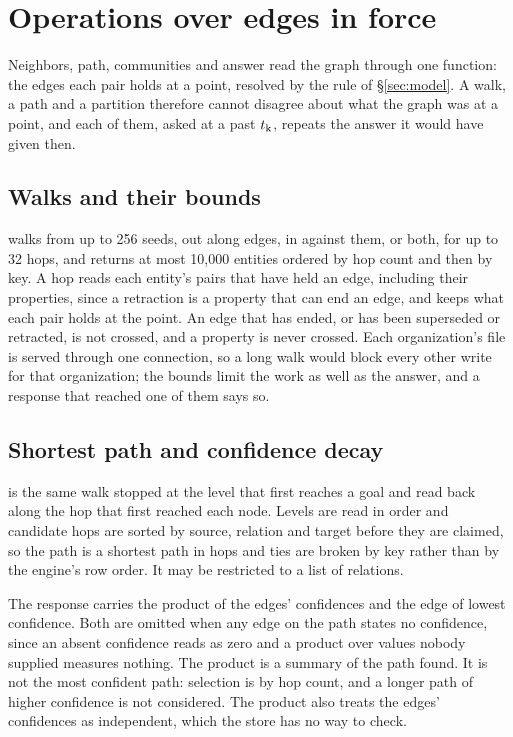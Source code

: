 \section{Operations over edges in force}
\label{sec:queries}

Neighbors, path, communities and answer read the graph through one function: the
edges each pair holds at a point, resolved by the rule of \S\ref{sec:model}.
A walk, a path and a partition therefore cannot disagree about what the graph
was at a point, and each of them, asked at a past $t_{\mathrm{k}}$, repeats the answer it
would have given then.

\subsection{Walks and their bounds}

\shipped{}  walks from up to 256 seeds, out along edges, in against
them, or both, for up to 32 hops, and returns at most 10{,}000 entities ordered by
hop count and then by key. A hop reads each entity's pairs that have held an
edge, including their properties, since a retraction is a property that can end
an edge, and keeps what each pair holds at the point. An edge that has ended, or
has been superseded or retracted, is not crossed, and a property is never
crossed. Each organization's file is served through one connection, so a long
walk would block every other write for that organization; the bounds limit the
work as well as the answer, and a response that reached one of them says so.

\subsection{Shortest path and confidence decay}

\shipped{}  is the same walk stopped at the level that first reaches a
goal and read back along the hop that first reached each node. Levels are read
in order and candidate hops are sorted by source, relation and target before
they are claimed, so the path is a shortest path in hops and ties are broken by
key rather than by the engine's row order. It may be restricted to a list of
relations.

The response carries the product of the edges' confidences and the edge of
lowest confidence. Both are omitted when any edge on the path states no
confidence, since an absent confidence reads as zero and a product over values
nobody supplied measures nothing. The product is a summary of the path found. It
is not the most confident path: selection is by hop count, and a longer path of
higher confidence is not considered. The product also treats the edges'
confidences as independent, which the store has no way to check.

